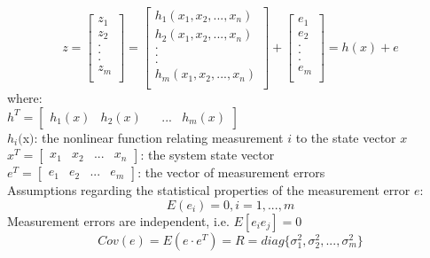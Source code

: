\documentclass[12pt]{article}
\begin{document}
\begin{equation}\label{eq:main}
z=\begin{bmatrix} z_1\\ z_2\\ .\\ .\\ .\\ z_m\\ \end{bmatrix} =
\begin{bmatrix} h_1(x_1,x_2,...,x_n)\\ h_2(x_1,x_2,...,x_n)\\ .\\ .\\ .\\ h_m(x_1,x_2,...,x_n)\\ \end{bmatrix}+\begin{bmatrix} e_1\\ e_2\\ .\\ .\\ .\\ e_m\\ \end{bmatrix}
=h(x)+e
\end{equation} 
where: \\
$h^{T} = \begin{bmatrix} h_1(x) & h_2(x) && ... & h_{m}(x) \end{bmatrix}$\\
$h_{i}($x$)$: the nonlinear function relating measurement $i$ to the state vector $x$ \\
$x^{T} = \begin{bmatrix} x_{1} & x_{2} & ... & x_{n} \end{bmatrix}$: the system state vector \\
$e^{T} = \begin{bmatrix} e_{1} & e_{2} & ... & e_{m} \end{bmatrix}$: the vector of measurement errors\\

Assumptions regarding the statistical properties of the measurement error $e$:
\begin{equation}
E(e_i) = 0, i = 1,...,m
\end{equation} 
Measurement errors are independent, i.e. $E[e_ie_j]=0$
\begin{equation}
Cov(e)=E(e\cdot e^T) = R =diag \{{\sigma_1 ^2,\sigma_2^2,...,\sigma_m ^2}\}
\end{equation} 
\end{document}
